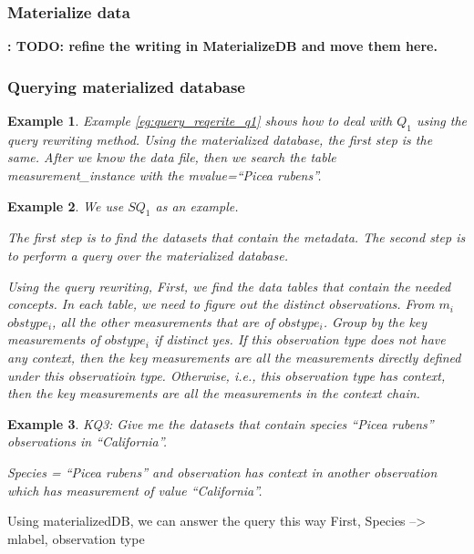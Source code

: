 \documentclass[conference]{IEEEtran}
\newtheorem{example}{Example}[section]
\begin{document}
\subsubsection{Materialize data}
{\bf: TODO: refine the writing in MaterializeDB and move them here.}

\subsubsection{Querying materialized database}

\begin{example} \label{eg:materialize_db_q1}
Example \ref{eg:query_reqerite_q1} shows how to deal with $Q_1$ using
the query rewriting method. 
Using the  materialized database, the first step is the same.
After we know the data file, then we search the table {\em measurement\_instance} with the {\em mvalue=``Picea rubens''}. 
\end{example}

\begin{example}
We use $SQ_1$ as an example. 

The first step is to find the datasets that contain the metadata. 
The second step is to perform a query over the materialized database. 

Using the query rewriting, 
First, we find the data tables that contain the needed concepts. 
In each table, we need to figure out the distinct observations. 
From $m_i$ $obstype_i$, all the other measurements that are of
$obstype_i$. 
Group by the key measurements of $obstype_i$ if distinct yes.
If this observation type does not have any context, then the key
measurements are all the measurements directly defined under this
observatioin type. Otherwise, i.e., this observation type has context,
then the key measurements are all the measurements in the context
chain. 
\end{example}

\begin{example}
KQ3: Give me the datasets that contain species ``Picea rubens''
  observations in ``California''. 

Species = ``Picea rubens'' and observation has context {\em in}
another observation which has measurement of value ``California''. 
\end{example}

Using materializedDB, we can answer the query this way
First, Species --> mlabel, observation type 
\end{document}
